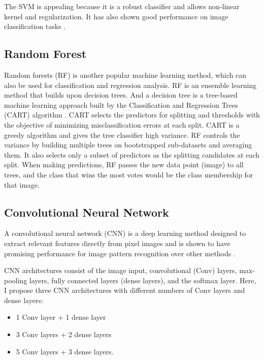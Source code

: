 \documentclass[letterpaper]{article} %
\begin{document}
The SVM is appealing because it is a robust classifier and allows non-linear kernel and regularization. It has also shown good performance on image classification tasks \cite{7930302}.

\subsection{Random Forest}

Random forests (RF) \cite{breiman2001random} is another popular machine learning method, which can also be used for classification and regression analysis. RF is an ensemble learning method that builds upon decision trees. And a decision tree is a tree-based machine learning approach built by the Classification and Regression Trees (CART) algorithm \cite{leo1984classification}. CART selects the predictors for splitting and thresholds with the objective of minimizing misclassification errors at each split. CART is a greedy algorithm and gives the tree classifier high variance. RF controls the variance by building multiple trees on bootstrapped sub-datasets and averaging them. It also selects only a subset of predictors as the splitting candidates at each split. When making predictions, RF passes the new data point (image) to all trees, and the class that wins the most votes would be the class membership for that image.

\subsection{Convolutional Neural Network}

A convolutional neural network (CNN) is a deep learning method designed to extract relevant features directly from pixel images and is shown to have promising performance for image pattern recognition over other methods \cite{726791, VALUEVA2020232}. 

CNN architectures consist of the image input, convolutional (Conv) layers, max-pooling layers, fully connected layers (dense layers), and the softmax layer.
Here, I propose three CNN architectures with different numbers of Conv layers and dense layers:
\begin{itemize}
    \item 1 Conv layer  +  1 dense layer
    \item 3 Conv layers + 2 dense layers
    \item 5 Conv layers + 3 dense layers.
\end{itemize}
\end{document}

